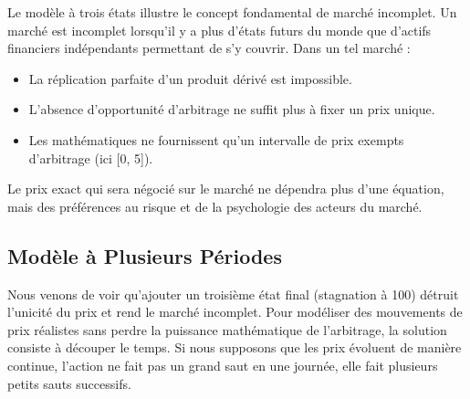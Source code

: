 \begin{theorembox}
Le modèle à trois états illustre le concept fondamental de marché incomplet. Un marché est incomplet lorsqu'il y a plus d'états futurs du monde que d'actifs financiers indépendants permettant de s'y couvrir.
Dans un tel marché :
\begin{itemize}[label=$\rightarrow$]
    \item La réplication parfaite d'un produit dérivé est impossible.
    \item L'absence d'opportunité d'arbitrage ne suffit plus à fixer un prix unique.
    \item Les mathématiques ne fournissent qu'un intervalle de prix exempts d'arbitrage (ici [0, 5]).
\end{itemize}
Le prix exact qui sera négocié sur le marché ne dépendra plus d'une équation, mais des préférences au risque et de la psychologie des acteurs du marché.
\end{theorembox}

\subsection{Modèle à Plusieurs Périodes}

\begin{intuitionbox}
Nous venons de voir qu'ajouter un troisième état final (stagnation à 100) détruit l'unicité du prix et rend le marché incomplet. 
Pour modéliser des mouvements de prix réalistes sans perdre la puissance mathématique de l'arbitrage, la solution consiste à découper le temps. Si nous supposons que les prix évoluent de manière continue, l'action ne fait pas un grand saut en une journée, elle fait plusieurs petits sauts successifs.
\end{intuitionbox}

\newpage

